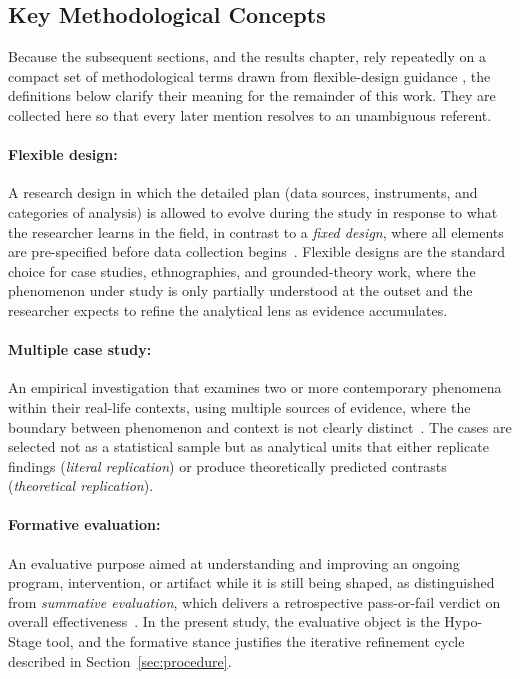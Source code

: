 \subsection{Key Methodological Concepts}
\label{sec:methodological-concepts}

Because the subsequent sections, and the results chapter, rely repeatedly on a
compact set of methodological terms drawn from flexible-design guidance \citep{robson2016}, the
definitions below clarify their meaning for the remainder of this work. They are
collected here so that every later mention resolves to an unambiguous referent.

\paragraph{Flexible design:} A research design in which the detailed plan (data
sources, instruments, and categories of analysis) is allowed to evolve during
the study in response to what the researcher learns in the field, in contrast
to a \emph{fixed design}, where all elements are pre-specified before data
collection begins~\citep{robson2016}. Flexible designs are the standard choice
for case studies, ethnographies, and grounded-theory work, where the phenomenon
under study is only partially understood at the outset and the researcher
expects to refine the analytical lens as evidence accumulates.

\paragraph{Multiple case study:} An empirical investigation that examines two
or more contemporary phenomena within their real-life contexts, using multiple
sources of evidence, where the boundary between phenomenon and context is not
clearly distinct~\citep{robson2016,yin2009}. The cases are selected not as a
statistical sample but as analytical units that either replicate findings
(\emph{literal replication}) or produce theoretically predicted contrasts
(\emph{theoretical replication}).

\paragraph{Formative evaluation:} An evaluative purpose aimed at understanding
and improving an ongoing program, intervention, or artifact while it is still
being shaped, as distinguished from \emph{summative evaluation}, which delivers
a retrospective pass-or-fail verdict on overall effectiveness~\citep{robson2016}.
In the present study, the evaluative object is the Hypo-Stage tool, and the
formative stance justifies the iterative refinement cycle described in
Section~\ref{sec:procedure}.


